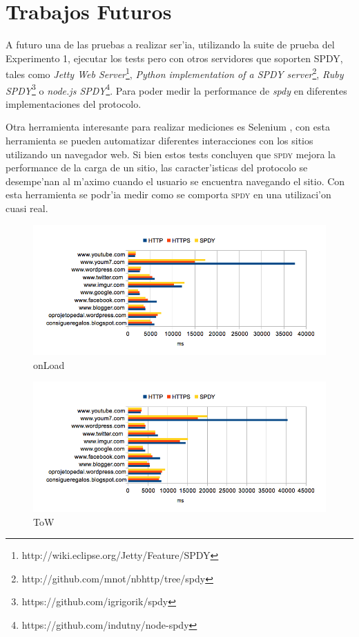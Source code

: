 \documentclass[a4paper,11pt,twocolumn]{article}
\begin{document}
\section{Trabajos Futuros}

A futuro una de las pruebas a realizar ser'ia, utilizando la suite de prueba del Experimento 1, ejecutar los tests pero con otros servidores que soporten SPDY, tales como \emph{Jetty Web Server}\footnote{http://wiki.eclipse.org/Jetty/Feature/SPDY}, \emph{Python implementation of a SPDY server}\footnote{http://github.com/mnot/nbhttp/tree/spdy}, \emph{Ruby SPDY}\footnote{https://github.com/igrigorik/spdy} o \emph{node.js SPDY}\footnote{https://github.com/indutny/node-spdy}. Para poder medir la performance de \emph{spdy} en diferentes implementaciones del protocolo.

Otra herramienta interesante para realizar mediciones es Selenium \cite{selenium}, con esta herramienta se pueden automatizar diferentes interacciones con los sitios utilizando un navegador web. Si bien estos tests concluyen que \textsc{spdy} mejora la performance de la carga de un sitio, las caracter'isticas del protocolo se desempe'nan al m'aximo cuando el usuario se encuentra navegando el sitio. Con esta herramienta se podr'ia medir como se comporta \textsc{spdy} en una utilizaci'on cuasi real.

\begin{figure}[h]
  	\centering
	\includegraphics[scale=0.83]{exp2_2}
	\caption{\small onLoad}
	\label{graf8}
\end{figure}

\begin{figure}[h]
  	\centering
	\includegraphics[scale=0.83]{exp2_3}
	\caption{\small ToW}
	\label{graf9}
\end{figure}

\onecolumn

\nocite{*}

\end{document}

